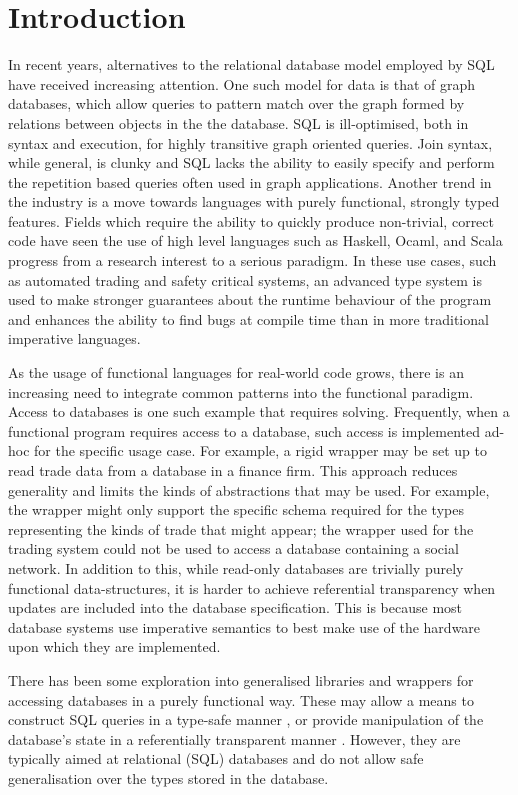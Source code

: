 \documentclass[12pt,a4paper,twoside,openright]{report}
\begin{document}
\chapter{Introduction}
In recent years, alternatives to the relational database model employed by SQL have received increasing attention. One such model for data is that of graph databases, which allow queries to pattern match over the graph formed by relations between objects in the the database. SQL is ill-optimised, both in syntax and execution, for highly transitive graph oriented queries. Join syntax, while general, is clunky and SQL lacks the ability to easily specify and perform the repetition based queries often used in graph applications. Another trend in the industry is a move towards languages with purely functional, strongly typed features. Fields which require the ability to quickly produce non-trivial, correct code have seen the use of high level languages such as Haskell, Ocaml, and Scala progress from a research interest to a serious paradigm. In these use cases, such as automated trading and safety critical systems, an advanced type system is used to  make stronger guarantees about the runtime behaviour of the program and enhances the ability to find bugs at compile time than in more traditional imperative languages.
	
	As the usage of functional languages for real-world code grows, there is an increasing need to integrate common patterns into the functional paradigm. Access to databases is one such example that requires solving. Frequently, when a functional program requires access to a database, such access is implemented ad-hoc for the specific usage case. For example, a rigid wrapper may be set up to read trade data from a database in a finance firm. This approach reduces generality and limits the kinds of abstractions that may be used. For example, the wrapper might only support the specific schema required for the types representing the kinds of trade that might appear; the wrapper used for the trading system could not be used to access a database containing a social network. In addition to this, while read-only databases are trivially purely functional data-structures, it is harder to achieve referential transparency when updates are included into the database specification. This is because most database systems use imperative semantics to best make use of the hardware upon which they are implemented.

	There has been some exploration into generalised libraries and wrappers for accessing databases in a purely functional way. These may allow a means to construct SQL queries in a type-safe manner \cite{HaskellDB}, or provide manipulation of the database’s state in a referentially transparent manner \cite{DBStates}. However, they are typically aimed at relational (SQL) databases and do not allow safe generalisation over the types stored in the database.
\end{document}
